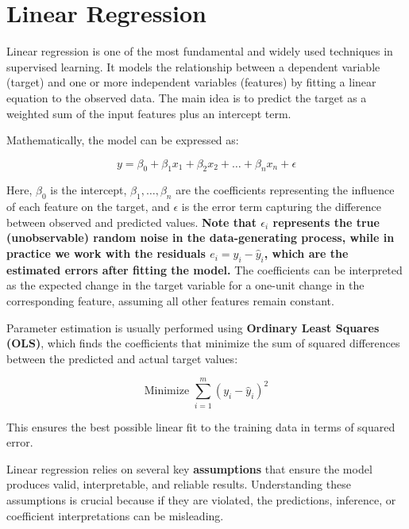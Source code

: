 
\section{Linear Regression}

Linear regression is one of the most fundamental and widely used techniques in supervised learning. It models the relationship between a dependent variable (target) and one or more independent variables (features) by fitting a linear equation to the observed data. The main idea is to predict the target as a weighted sum of the input features plus an intercept term.

Mathematically, the model can be expressed as:

\[
y = \beta_0 + \beta_1 x_1 + \beta_2 x_2 + \dots + \beta_n x_n + \epsilon
\]

Here, $\beta_0$ is the intercept, $\beta_1, \dots, \beta_n$ are the coefficients representing the influence of each feature on the target, and $\epsilon$ is the error term capturing the difference between observed and predicted values. \textbf{Note that $\epsilon_i$ represents the true (unobservable) random noise in the data-generating process, while in practice we work with the residuals $e_i = y_i - \hat{y}_i$, which are the estimated errors after fitting the model.} The coefficients can be interpreted as the expected change in the target variable for a one-unit change in the corresponding feature, assuming all other features remain constant.

Parameter estimation is usually performed using \textbf{Ordinary Least Squares (OLS)}, which finds the coefficients that minimize the sum of squared differences between the predicted and actual target values:

\[
\text{Minimize } \sum_{i=1}^m (y_i - \hat{y}_i)^2
\]

This ensures the best possible linear fit to the training data in terms of squared error.

Linear regression relies on several key \textbf{assumptions} that ensure the model produces valid, interpretable, and reliable results. Understanding these assumptions is crucial because if they are violated, the predictions, inference, or coefficient interpretations can be misleading.

